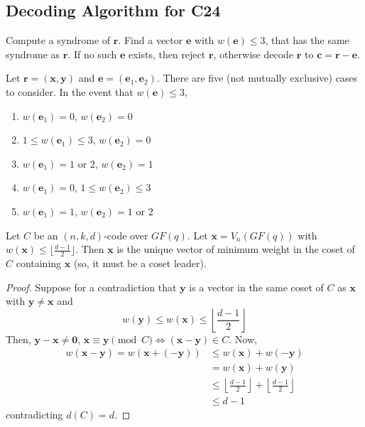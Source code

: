 \subsection*{Decoding Algorithm for C24}
Compute a syndrome of $ \bm{r} $. Find a vector $ \bm{e} $ with $ w(\bm{e})\leqslant 3 $,
that has the same syndrome as $ \bm{r} $. If no such $ \bm{e} $ exists, then
reject $ \bm{r} $, otherwise decode $ \bm{r} $ to $ \bm{c}=\bm{r}-\bm{e} $.

Let $ \bm{r}=(\bm{x},\bm{y}) $ and $ \bm{e}=(\bm{e}_1,\bm{e}_2) $.
There are five (not mutually exclusive) cases to consider. In the event that
$ w(\bm{e})\leqslant 3 $,
\begin{enumerate}[label=(\Alph*)]
    \item $ w(\bm{e}_1)=0 $, $ w(\bm{e}_2)=0 $
    \item $ 1\leqslant w(\bm{e}_1)\leqslant 3 $, $ w(\bm{e}_2)=0 $
    \item $ w(\bm{e}_1)=1 $ or $ 2 $, $ w(\bm{e}_2)=1 $
    \item $ w(\bm{e}_1)=0 $, $ 1\leqslant w(\bm{e}_2)\leqslant 3 $
    \item $ w(\bm{e}_1)=1 $, $ w(\bm{e}_2)=1 $ or $ 2 $
\end{enumerate}

\begin{Theorem}{}{}
    Let $ C $ be an $ (n,k,d) $-code over $ GF(q) $. Let $ \bm{x}=
        V_n(GF(q)) $ with $ w(\bm{x})\leqslant \lfloor \frac{d-1}{2} \rfloor $.
    Then $ \bm{x} $ is the unique vector of minimum weight in the coset
    of $ C $ containing $ \bm{x} $ (so, it must be a coset leader).
\end{Theorem}

\begin{proof}
    Suppose for a contradiction that
    $ \bm{y} $ is a vector in the same coset of $ C $ as $ \bm{x} $
    with $ \bm{y}\neq \bm{x} $ and
    \[ w(\bm{y})\leqslant w(\bm{x})\leqslant \left\lfloor \frac{d-1}{2} \right\rfloor \]
    Then, $ \bm{y}-\bm{x}\neq \bm{0} $, $ \bm{x}\equiv \bm{y}\pmod{C} \iff
        (\bm{x}-\bm{y})\in C $. Now,
    \begin{align*}
        w(\bm{x}-\bm{y})=w(\bm{x}+(-\bm{y}))
         & \leqslant w(\bm{x})+w(-\bm{y})                                                                \\
         & =w(\bm{x})+w(\bm{y})                                                                          \\
         & \leqslant \left\lfloor \frac{d-1}{2} \right\rfloor + \left\lfloor \frac{d-1}{2} \right\rfloor \\
         & \leqslant d-1
    \end{align*}
    contradicting $ d(C)=d $.
\end{proof}
